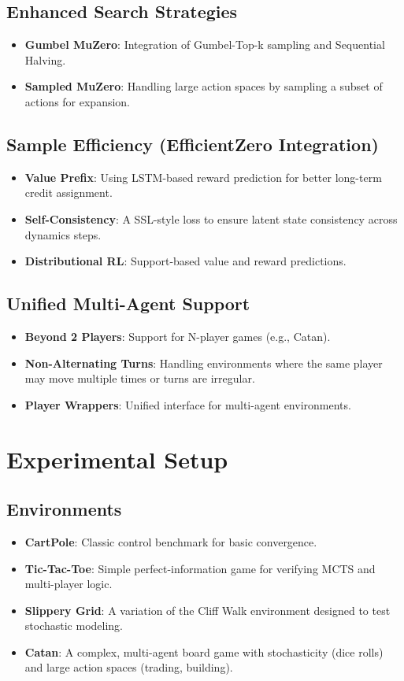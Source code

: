 \documentclass[twocolumn,10pt]{article}
\begin{document}
\subsection{Enhanced Search Strategies}
\begin{itemize}
    \item \textbf{Gumbel MuZero}: Integration of Gumbel-Top-k sampling and Sequential Halving.
    \item \textbf{Sampled MuZero}: Handling large action spaces by sampling a subset of actions for expansion.
\end{itemize}

\subsection{Sample Efficiency (EfficientZero Integration)}
\begin{itemize}
    \item \textbf{Value Prefix}: Using LSTM-based reward prediction for better long-term credit assignment.
    \item \textbf{Self-Consistency}: A SSL-style loss to ensure latent state consistency across dynamics steps.
    \item \textbf{Distributional RL}: Support-based value and reward predictions.
\end{itemize}

\subsection{Unified Multi-Agent Support}
\begin{itemize}
    \item \textbf{Beyond 2 Players}: Support for N-player games (e.g., Catan).
    \item \textbf{Non-Alternating Turns}: Handling environments where the same player may move multiple times or turns are irregular.
    \item \textbf{Player Wrappers}: Unified interface for multi-agent environments.
\end{itemize}

\section{Experimental Setup}
\subsection{Environments}
\begin{itemize}
    \item \textbf{CartPole}: Classic control benchmark for basic convergence.
    \item \textbf{Tic-Tac-Toe}: Simple perfect-information game for verifying MCTS and multi-player logic.
    \item \textbf{Slippery Grid}: A variation of the Cliff Walk environment designed to test stochastic modeling.
    \item \textbf{Catan}: A complex, multi-agent board game with stochasticity (dice rolls) and large action spaces (trading, building).
\end{itemize}
\end{document}
